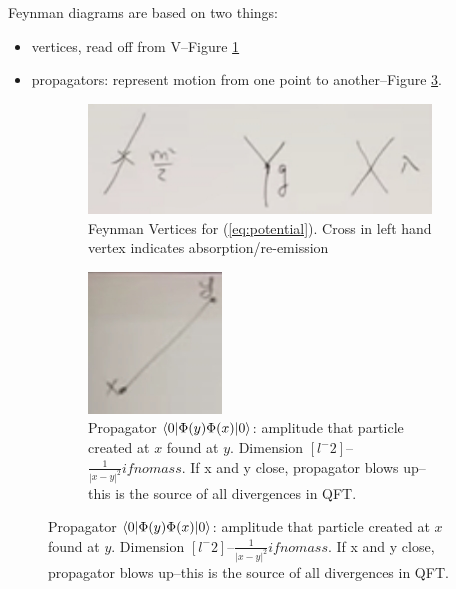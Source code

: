 \documentclass[]{article}
\begin{document}
Feynman diagrams are based on two things:
\begin{itemize}
	\item vertices, read off from V--Figure \ref{fig:3-1-feynman-vertices}
	\item propagators: represent motion from one point to another--Figure \ref{fig:3-1-feynman-propagator}.
\end{itemize}

\begin{figure}[H]
	\begin{center}
		\caption{Elements of a Feynman diagram}
		\begin{subfigure}[t]{0.45\textwidth}
			\caption{Feynman Vertices for (\ref{eq:potential}). Cross in left hand vertex indicates absorption/re-emission}\label{fig:3-1-feynman-vertices}
			\includegraphics[width=\textwidth]{3-1-feynman-vertices}
		\end{subfigure}
			\begin{subfigure}[t]{0.45\textwidth}
			\caption{Propagator $\braket{0|\Phi(y)\Phi(x)|0}$: amplitude that particle created at $x$ found at $y$. Dimension $[l^-2]$--$\frac{1}{|x-y|^2} if no mass$. If x and y close, propagator blows up--this is the source of all divergences in QFT.}\label{fig:3-1-feynman-propagator}
		\includegraphics[width=\textwidth]{3-1-feynman-propagator}
	\end{subfigure}
	\end{center}
\end{figure}
\end{document}
